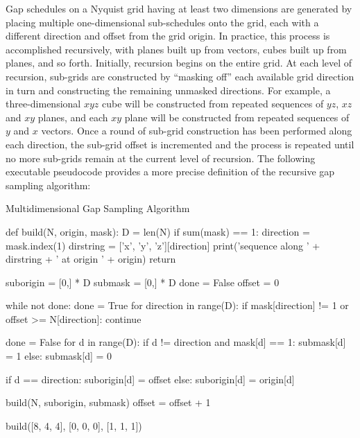 \begin{doublespace}
Gap schedules on a Nyquist grid having at least two dimensions are generated
by placing multiple one-dimensional sub-schedules onto the grid, each with a
different direction and offset from the grid origin. In practice, this process
is accomplished recursively, with planes built up from vectors, cubes built up
from planes, and so forth. Initially, recursion begins on the entire grid. At
each level of recursion, sub-grids are constructed by ``masking off'' each
available grid direction in turn and constructing the remaining unmasked
directions. For example, a three-dimensional $xyz$ cube will be constructed
from repeated sequences of $yz$, $xz$ and $xy$ planes, and each $xy$ plane
will be constructed from repeated sequences of $y$ and $x$ vectors. Once a
round of sub-grid construction has been performed along each direction, the
sub-grid offset is incremented and the process is repeated until no more
sub-grids remain at the current level of recursion. The following executable
pseudocode provides a more precise definition of the recursive gap sampling
algorithm:
\end{doublespace}

\begin{algorithm}[H]
\caption{Multidimensional Gap Sampling Algorithm}
\label{algorithm.2.1}
\begin{python}
def build(N, origin, mask):
  D = len(N)
  if sum(mask) == 1:
    direction = mask.index(1)
    dirstring = ['x', 'y', 'z'][direction]
    print('sequence along ' + dirstring + ' at origin ' + origin)
    return

  suborigin = [0,] * D
  submask = [0,] * D
  done = False
  offset = 0

  while not done:
    done = True
    for direction in range(D):
      if mask[direction] != 1 or offset >= N[direction]:
        continue

      done = False
      for d in range(D):
        if d != direction and mask[d] == 1:
          submask[d] = 1
        else:
          submask[d] = 0

        if d == direction:
          suborigin[d] = offset
        else:
          suborigin[d] = origin[d]

      build(N, suborigin, submask)
    offset = offset + 1

build([8, 4, 4], [0, 0, 0], [1, 1, 1])
\end{python}
\end{algorithm}

